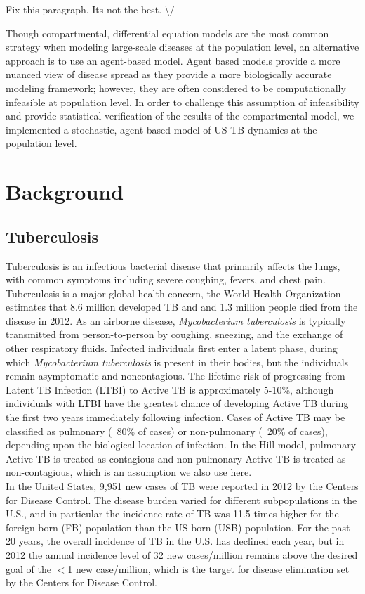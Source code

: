\documentclass{amsart}
\begin{document}
{\huge \color{red} Fix this paragraph. Its not the best. \textbackslash/}

Though compartmental, differential equation models are the most common strategy
when modeling large-scale diseases at the population level, an alternative
approach is to use an agent-based model. Agent
based models provide a more nuanced view of disease spread as they provide a
more biologically accurate modeling framework; however, they are often
considered to be computationally infeasible at population level. In order to
challenge this assumption of infeasibility and provide statistical verification
of the results of the compartmental model, we implemented a stochastic,
agent-based model of US TB dynamics at the population level.

\section{Background}
\subsection{Tuberculosis}
Tuberculosis is an infectious bacterial disease that primarily affects the lungs,
with common symptoms including severe coughing, fevers, and chest pain.
Tuberculosis is a major global health concern, the World Health Organization
 estimates that 8.6 million developed TB and and 1.3 million people died from
 the disease in 2012.  As an airborne disease, \emph{Mycobacterium tuberculosis}
 is typically transmitted from person-to-person by coughing, sneezing, and the 
exchange of other respiratory fluids.  Infected individuals first enter a latent phase,
 during which \emph{Mycobacterium tuberculosis} is present in their bodies,
but the individuals remain asymptomatic and noncontagious. 
The lifetime risk of progressing from Latent TB Infection (LTBI) to Active TB is approximately
5-10\%, although individuals with LTBI have the greatest chance of developing 
Active TB during the first two years immediately following infection. 
Cases of Active TB may be classified as pulmonary (~80\% of cases) or 
non-pulmonary (~20\% of cases), depending upon the biological location of infection.
In the Hill model, pulmonary Active TB is treated as contagious and non-pulmonary 
Active TB is treated as  non-contagious, which is an assumption we also use here.  \\

In the United States, 9,951 new cases of TB were reported in 2012 by the Centers for Disease
Control. The disease burden varied for different subpopulations in the U.S., and in particular
the incidence rate of TB was 11.5 times higher for the foreign-born (FB) population
than the US-born (USB) population.  For the past 20 years, the overall incidence of
TB in the U.S. has declined each year, but in 2012 the annual incidence level of 32 new cases/million
remains above the desired goal of the $<$1 new case/million, which is the target
for disease elimination set by the Centers for Disease Control. \\
\end{document}
